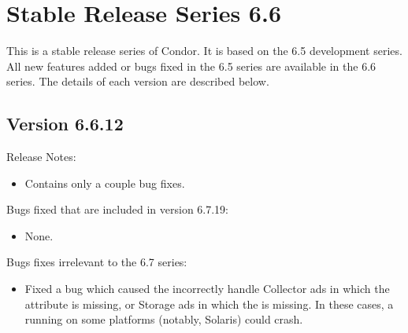 \section{\label{sec:History-6-6}Stable Release Series 6.6}

This is a stable release series of Condor.
It is based on the 6.5 development series.
All new features added or bugs fixed in the 6.5 series are available
in the 6.6 series.
The details of each version are described below.


\subsection{\label{sec:New-6-6-12}Version 6.6.12}

\noindent Release Notes:

\begin{itemize}

\item Contains only a couple bug fixes.

\end{itemize}

%
%
%

\noindent Bugs fixed that are included in version 6.7.19:

\begin{itemize}

\item None.

\end{itemize}


\noindent Bugs fixes irrelevant to the 6.7 series:

\begin{itemize}

\item Fixed a bug which caused the  incorrectly
  handle Collector ads in which the  attribute is
  missing, or Storage ads in which the  is missing.  In
  these cases, a  running on some platforms
  (notably, Solaris) could crash.

\end{itemize}


